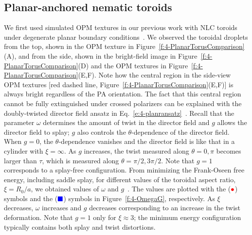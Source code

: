 \subsection{Planar-anchored nematic toroids}
We first used simulated OPM textures in our previous work with NLC toroids under degenerate planar boundary conditions~\cite{RN24}.
We observed the toroidal droplets from the top, shown in the OPM texture in Figure~\ref{f:4-PlanarTorusComparison}(A), and from the side, shown in the bright-field image in Figure~\ref{f:4-PlanarTorusComparison}(D) and the OPM textures in Figure~\ref{f:4-PlanarTorusComparison}(E,F).
Note how the central region in the side-view OPM textures [red dashed line, Figure~\ref{f:4-PlanarTorusComparison}(E,F)] is always bright regardless of the PA orientation.
The fact that this central region cannot be fully extinguished under crossed polarizers can be explained with the doubly-twisted director field ansatz in Eq.~\ref{e:4-planransatz}~\cite{RN24}.
Recall that the parameter $\omega$ determines the amount of twist in the director field and $g$ allows the director field to splay; $g$ also controls the $\theta$-dependence of the director field.
When $g = 0$, the $\theta$-dependence vanishes and the director field is like that in a cylinder with $\xi = \infty$.
As $g$ increases, the twist measured along $\theta = 0,\pi$ becomes larger than $\tau$, which is measured along $\theta = \pi/2, 3\pi/2$.
Note that $g=1$ corresponds to a splay-free configuration.
From minimizing the Frank-Oseen free energy, including saddle splay, for different values of the toroidal aspect ratio, $\xi = R_0/a$, we obtained values of $\omega$ and $g$~\cite{RN24}.
The values are plotted with the (${\color{red} \bullet}$) symbols and the (${\color{blue} \blacksquare}$) symbols in Figure~\ref{f:4-OmegaG}, respectively.
As $\xi$ decreases, $\omega$ increases and $g$ decreases corresponding to an increase in the twist deformation.
Note that $g = 1$ only for $\xi \approx 3$; the minimum energy configuration typically contains both splay and twist distortions.

